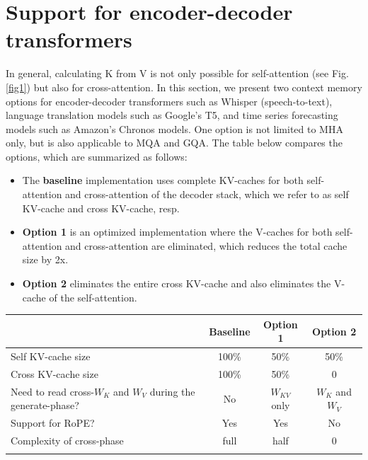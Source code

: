 \documentclass{article}
\def\fline{\Xhline{2\arrayrulewidth}}              %
\begin{document}
\section{Support for encoder-decoder transformers} \label{sec:enc-dec}
In general, calculating K from V is not only possible for self-attention (see Fig. \ref{fig1}) but also for cross-attention. In this section, we present two context memory options for encoder-decoder transformers such as Whisper (speech-to-text), language translation models such as Google’s T5, and time series forecasting models such as Amazon’s Chronos models. One option is not limited to MHA only, but is also applicable to MQA and GQA. The table below compares the options, which are summarized as follows:
\begin{itemize}[topsep=-1pt]
  \item The \textbf{baseline} implementation uses complete KV-caches for both self-attention and cross-attention of the decoder stack, which we refer to as self KV-cache and cross KV-cache, resp.
  \item \textbf{Option 1} is an optimized implementation where the V-caches for both self-attention and cross-attention are eliminated, which reduces the total cache size by 2x.
  \item \textbf{Option 2} eliminates the entire cross KV-cache and also eliminates the V-cache of the self-attention.
\end{itemize}
\begin{table}[h!] \centering \begin{tabular}{lccc} \fline
                             & Baseline & Option 1 & Option 2 \\ \hline
  Self KV-cache size         & 100\%    & 50\%     & 50\%     \\
  Cross KV-cache size        & 100\%    & 50\%     & 0        \\
  \makecell[l]{Need to read cross-$W_K$ and $W_V$ \\ during the generate-phase?} & No & $W_{KV}$ only & $W_K$ and $W_V$ \\
  Support for RoPE?          & Yes      & Yes      & No       \\
  Complexity of cross-phase  & full     & half     & 0        \\ \fline
\end{tabular} \end{table}
\end{document}

